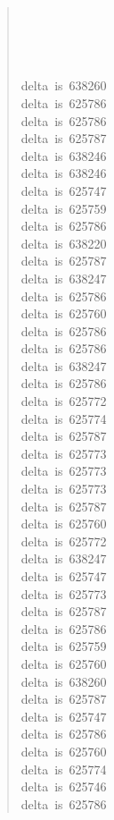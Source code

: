 \documentclass[letterpaper]{article}
\begin{document}
\begin{quote}
{~\\
~\\
~\\
~\\
delta~is~638260\\
delta~is~625786\\
delta~is~625786\\
delta~is~625787\\
delta~is~638246\\
delta~is~638246\\
delta~is~625747\\
delta~is~625759\\
delta~is~625786\\
delta~is~638220\\
delta~is~625787\\
delta~is~638247\\
delta~is~625786\\
delta~is~625760\\
delta~is~625786\\
delta~is~625786\\
delta~is~638247\\
delta~is~625786\\
delta~is~625772\\
delta~is~625774\\
delta~is~625787\\
delta~is~625773\\
delta~is~625773\\
delta~is~625773\\
delta~is~625787\\
delta~is~625760\\
delta~is~625772\\
delta~is~638247\\
delta~is~625747\\
delta~is~625773\\
delta~is~625787\\
delta~is~625786\\
delta~is~625759\\
delta~is~625760\\
delta~is~638260\\
delta~is~625787\\
delta~is~625747\\
delta~is~625786\\
delta~is~625760\\
delta~is~625774\\
delta~is~625746\\
delta~is~625786\\
}
\end{quote}
\end{document}
